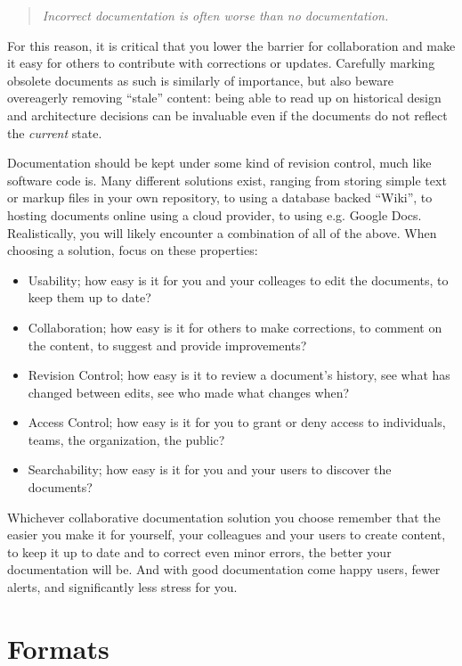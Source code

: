 \begin{quote}
{\em Incorrect documentation is often worse than no documentation.}
\end{quote}

For this reason, it is critical that you lower the
barrier for collaboration and make it easy for others
to contribute with corrections or updates.  Carefully
marking obsolete documents as such is similarly of
importance, but also beware overeagerly removing
``stale'' content: being able to read up on historical
design and architecture decisions can be invaluable
even if the documents do not reflect the {\em current}
state.

Documentation should be kept under some kind of
revision control, much like
software code is.  Many different solutions exist,
ranging from storing simple text or markup files in
your own repository, to using a database backed
``Wiki'', to hosting documents online
using a cloud provider, to using e.g.  Google
Docs.  Realistically, you will
likely encounter a combination of all of the above.
When choosing a solution, focus on these properties:

\begin{itemize}
	\item Usability; how easy is it for you and
		your colleages to edit the documents,
		to keep them up to date?
	\item Collaboration; how easy is it for others
		to make corrections, to comment on the content,
		to suggest and provide improvements?
	\item Revision Control; how easy is it to
		review a document's history, see what
		has changed between edits, see who
		made what changes when?
	\item Access Control; how easy is it for you
		to grant or deny access to individuals,
		teams, the organization, the public?
	\item Searchability; how easy is it for you
		and your users to discover the documents?
\end{itemize}

Whichever collaborative documentation solution you
choose remember that the easier you make it for
yourself, your colleagues and your users to create
content, to keep it up to date and to correct even
minor errors, the better your documentation will be.
And with good documentation come happy users, fewer
alerts, and significantly less stress for you.

\section{Formats}
\label{documentation:formats}

